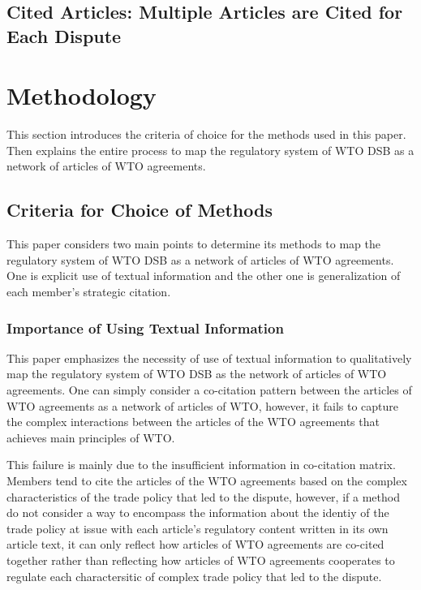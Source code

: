 \documentclass[12pt,letterpaper]{article}
\begin{document}
\subsection{Cited Articles: Multiple Articles are Cited for Each Dispute}


\section{Methodology}
This section introduces the criteria of choice for the methods used in this paper. 
Then explains the entire process
to map the regulatory system of WTO DSB as a network of articles of WTO agreements.

\subsection{Criteria for Choice of Methods}
This paper considers two main points to
determine its methods to map the regulatory system of WTO DSB
as a network of articles of WTO agreements. 
One is explicit use of textual information and the other one is
generalization of each member's strategic citation.

\subsubsection{Importance of Using Textual Information}

This paper emphasizes the necessity of use of textual information 
to qualitatively map the regulatory system of WTO DSB as the network of articles of WTO agreements.
One can simply consider a co-citation pattern between the articles of WTO agreements as a network of articles of WTO, however,
it fails to capture the complex interactions between the articles of the WTO agreements that achieves main principles of WTO.

This failure is mainly due to the insufficient information in co-citation matrix. Members tend to cite the articles of 
the WTO agreements based on the complex characteristics of 
the trade policy that led to the dispute, however, if a method 
do not consider a way to encompass the information
about the identiy of the trade policy at issue with 
each article's regulatory content written in its own article text,
it can only reflect how articles of WTO agreements are co-cited 
together rather than reflecting how articles of WTO agreements 
cooperates to regulate each charactersitic of complex trade policy that led to the dispute. 
\end{document}
